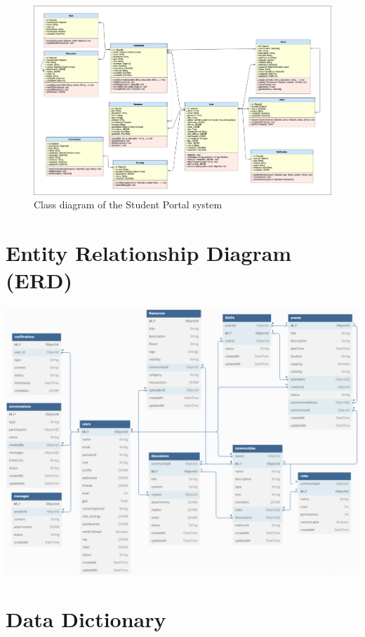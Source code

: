 \begin{figure}[H]
    \centering
    \includegraphics[width=\textwidth]{images/uml.png} 
    \caption{Class diagram of the Student Portal system}
    \label{fig:class_diagram}
\end{figure}

\section{Entity Relationship Diagram (ERD)}
\begin{adjustbox}{width=\textwidth, height=0.35\textheight, keepaspectratio, center}
    \includegraphics{images/schema_diagram.png}
\end{adjustbox}



\section{Data Dictionary}

